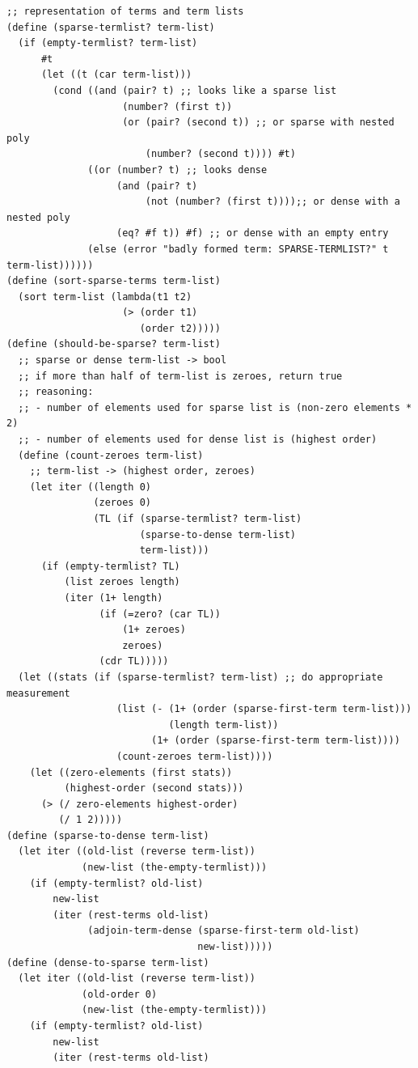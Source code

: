 \documentclass[final,fleqn,titlepage,twoside]{article}
\begin{document}
\begin{verbatim}
;; representation of terms and term lists
(define (sparse-termlist? term-list)
  (if (empty-termlist? term-list)
      #t
      (let ((t (car term-list)))
        (cond ((and (pair? t) ;; looks like a sparse list
                    (number? (first t))
                    (or (pair? (second t)) ;; or sparse with nested poly
                        (number? (second t)))) #t)
              ((or (number? t) ;; looks dense
                   (and (pair? t)
                        (not (number? (first t))));; or dense with a nested poly
                   (eq? #f t)) #f) ;; or dense with an empty entry
              (else (error "badly formed term: SPARSE-TERMLIST?" t term-list))))))
(define (sort-sparse-terms term-list)
  (sort term-list (lambda(t1 t2)
                    (> (order t1)
                       (order t2)))))
(define (should-be-sparse? term-list)
  ;; sparse or dense term-list -> bool
  ;; if more than half of term-list is zeroes, return true
  ;; reasoning:
  ;; - number of elements used for sparse list is (non-zero elements * 2)
  ;; - number of elements used for dense list is (highest order)
  (define (count-zeroes term-list)
    ;; term-list -> (highest order, zeroes)
    (let iter ((length 0)
               (zeroes 0)
               (TL (if (sparse-termlist? term-list)
                       (sparse-to-dense term-list)
                       term-list)))
      (if (empty-termlist? TL)
          (list zeroes length)
          (iter (1+ length)
                (if (=zero? (car TL))
                    (1+ zeroes)
                    zeroes)
                (cdr TL)))))
  (let ((stats (if (sparse-termlist? term-list) ;; do appropriate measurement
                   (list (- (1+ (order (sparse-first-term term-list)))
                            (length term-list))
                         (1+ (order (sparse-first-term term-list))))
                   (count-zeroes term-list))))
    (let ((zero-elements (first stats))
          (highest-order (second stats)))
      (> (/ zero-elements highest-order)
         (/ 1 2)))))
(define (sparse-to-dense term-list)
  (let iter ((old-list (reverse term-list))
             (new-list (the-empty-termlist)))
    (if (empty-termlist? old-list)
        new-list
        (iter (rest-terms old-list)
              (adjoin-term-dense (sparse-first-term old-list)
                                 new-list)))))
(define (dense-to-sparse term-list)
  (let iter ((old-list (reverse term-list))
             (old-order 0)
             (new-list (the-empty-termlist)))
    (if (empty-termlist? old-list)
        new-list
        (iter (rest-terms old-list)

\end{verbatim}
\end{document}
